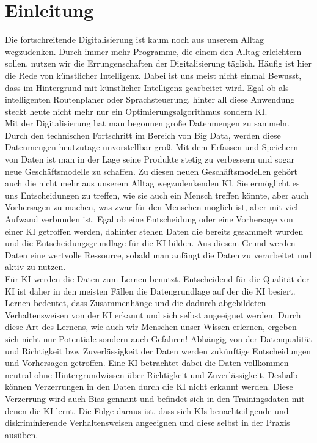 \chapter{Einleitung}
    \begin{onehalfspace}    
        \label{sec:einleitung}
        Die fortschreitende Digitalisierung ist kaum noch aus unserem Alltag wegzudenken. Durch immer mehr Programme, die einem den Alltag erleichtern sollen, nutzen wir die Errungenschaften der Digitalisierung täglich. Häufig ist hier die Rede von künstlicher Intelligenz. Dabei ist uns meist nicht einmal Bewusst, dass im Hintergrund mit künstlicher Intelligenz gearbeitet wird. Egal ob als intelligenten Routenplaner oder Sprachsteuerung, hinter all diese Anwendung steckt heute nicht mehr nur ein Optimierungsalgorithmus sondern \ac{KI}. \\
        Mit der Digitalisierung hat man begonnen große Datenmengen zu sammeln. Durch den technischen Fortschritt im Bereich von Big Data, werden diese Datenmengen heutzutage unvorstellbar groß. Mit dem Erfassen und Speichern von Daten ist man in der Lage seine Produkte stetig zu verbessern und sogar neue Geschäftsmodelle zu schaffen. Zu diesen neuen Geschäftsmodellen gehört auch die nicht mehr aus unserem Alltag wegzudenkenden \ac{KI}. Sie ermöglicht es uns Entscheidungen zu treffen, wie sie auch ein Mensch treffen könnte, aber auch Vorhersagen zu machen, was zwar für den Menschen möglich ist, aber mit viel Aufwand verbunden ist. Egal ob eine Entscheidung oder eine Vorhersage von einer \ac{KI} getroffen werden, dahinter stehen Daten die bereits gesammelt wurden und die Entscheidungsgrundlage für die \ac*{KI} bilden. Aus diesem Grund werden Daten eine wertvolle Ressource, sobald man anfängt die Daten zu verarbeitet und aktiv zu nutzen. \\
        Für \ac*{KI} werden die Daten zum Lernen benutzt. Entscheidend für die Qualität der \ac*{KI} ist daher in den meisten Fällen die Datengrundlage auf der die \ac*{KI} besiert. Lernen bedeutet, dass Zusammenhänge und die dadurch abgebildeten Verhaltensweisen von der \ac*{KI} erkannt und sich selbst angeeignet werden. Durch diese Art des Lernens, wie auch wir Menschen unser Wissen erlernen, ergeben sich nicht nur Potentiale sondern auch Gefahren! Abhängig von der Datenqualität und Richtigkeit \ac*{bzw} Zuverlässigkeit der Daten werden zukünftige Entscheidungen und Vorhersagen getroffen. Eine \ac*{KI} betrachtet dabei die Daten vollkommen neutral ohne Hintergrundwissen über Richtigkeit und Zuverlässigkeit. Deshalb können Verzerrungen in den Daten durch die \ac*{KI} nicht erkannt werden. Diese Verzerrung wird auch Bias gennant und befindet sich in den Trainingsdaten mit denen die \ac*{KI} lernt. Die Folge daraus ist, dass sich \ac*{KI}s benachteiligende und diskriminierende Verhaltensweisen angeeignen und diese selbst in der Praxis ausüben.\\

\end{onehalfspace}
